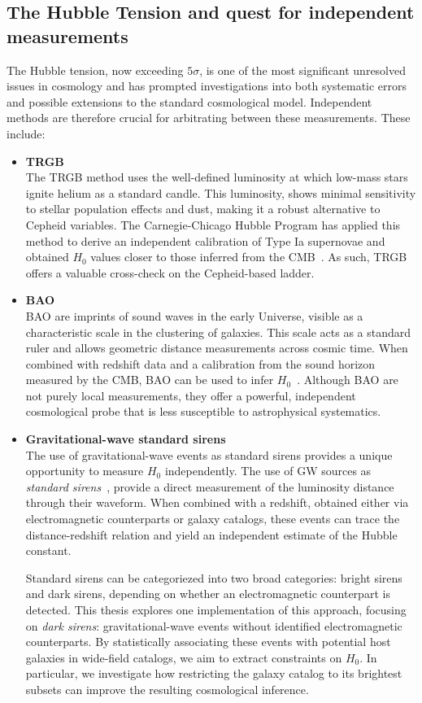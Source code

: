 \subsection{The Hubble Tension and quest for independent measurements}
The Hubble tension, now exceeding $5\sigma$, is one of the most significant unresolved issues in cosmology and has prompted investigations into both systematic errors and possible extensions to the standard cosmological model.
Independent methods are therefore crucial for arbitrating between these measurements. These include:
\begin{itemize}
    \item \textbf{\ac{TRGB}}\\
    The \ac{TRGB} method uses the well-defined luminosity at which low-mass stars ignite helium as a standard candle. This luminosity, shows minimal sensitivity to stellar population effects and dust, making it a robust alternative to Cepheid variables. The Carnegie-Chicago Hubble Program has applied this method to derive an independent calibration of Type Ia supernovae and obtained $H_0$ values closer to those inferred from the CMB~\citep{freedman2024status}. As such, \ac{TRGB} offers a valuable cross-check on the Cepheid-based ladder.
    \item \textbf{\ac{BAO}}\\
    \ac{BAO} are imprints of sound waves in the early Universe, visible as a characteristic scale in the clustering of galaxies. This scale acts as a standard ruler and allows geometric distance measurements across cosmic time. When combined with redshift data and a calibration from the sound horizon measured by the \ac{CMB}, \ac{BAO} can be used to infer $H_0$~\citep{cuceu2019baryon,alam2021completed}. Although \ac{BAO} are not purely local measurements, they offer a powerful, independent cosmological probe that is less susceptible to astrophysical systematics.

    \item \textbf{Gravitational-wave standard sirens}\\
    The use of gravitational-wave events as standard sirens provides a unique opportunity to measure $H_0$ independently.  The use of \ac{GW} sources as \textit{standard sirens}~\citep{schutz1986determining}, provide a direct measurement of the luminosity distance through their waveform. When combined with a redshift, obtained either via electromagnetic counterparts or galaxy catalogs, these events can trace the distance-redshift relation and yield an independent estimate of the Hubble constant.

    Standard sirens can be categoriezed into two broad categories: bright sirens and dark sirens, depending on whether an electromagnetic counterpart is detected. This thesis explores one implementation of this approach, focusing on \textit{dark sirens}: gravitational-wave events without identified electromagnetic counterparts. By statistically associating these events with potential host galaxies in wide-field catalogs, we aim to extract constraints on $H_0$. In particular, we investigate how restricting the galaxy catalog to its brightest subsets can improve the resulting cosmological inference.
\end{itemize}

